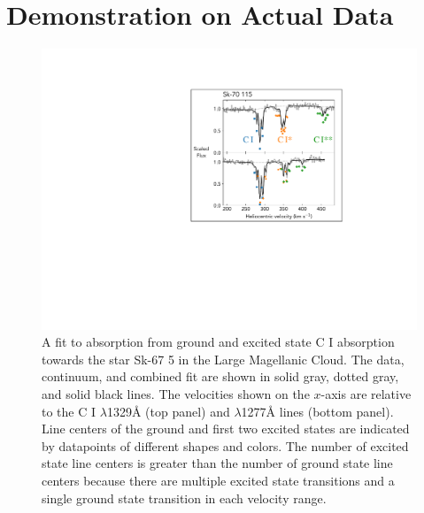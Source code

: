 \documentclass[manuscript]{aastex62}
\begin{document}
\section{Demonstration on Actual Data}
\label{sec:demonstration-actual-data}
\begin{figure}
  \centering
  \includegraphics{annotated-SK-675.pdf}
  \caption{
  A fit to absorption from ground and excited state {C \small{I}} absorption towards the star Sk-67 5 in the Large Magellanic Cloud.
  The data, continuum, and combined fit are shown in solid gray, dotted gray, and solid black lines.
  The velocities shown on the $x$-axis are relative to the {C \small{I}} $\lambda$1329\AA{} (top panel) and $\lambda$1277\AA{} lines (bottom panel).
  Line centers of the ground and first two excited states are indicated by datapoints of different shapes and colors.
  The number of excited state line centers is greater than the number of ground state line centers because there are multiple excited state transitions and a single ground state transition in each velocity range.
  }
  \label{fig:demonstration-fit}
\end{figure}
\end{document}

